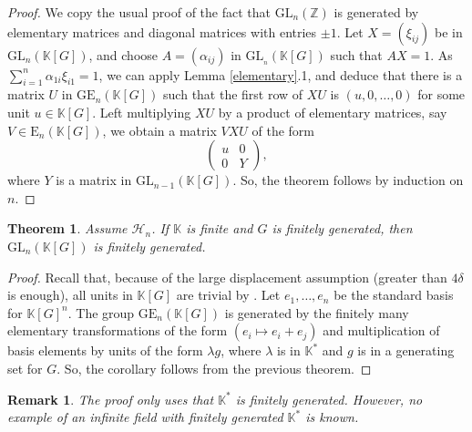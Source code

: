 \documentclass[11pt,letterpaper]{amsart}
\newtheorem{theorem}{Theorem}
\newtheorem*{remark}{Remark}
\begin{document}
\begin{proof}
We copy the usual proof of the fact that $\text{GL}_n (\mathbb{Z})$ is generated by elementary matrices and diagonal matrices with entries $\pm 1$. Let $X = (\xi_{ij})$ be in $\text{GL}_n (\mathbb{K} [G])$, and choose $A=(\alpha_{ij})$ in $\text{GL}_{_n} (\mathbb{K} [G])$ such that $AX = 1$. As $\sum_{i = 1}^n \alpha_{1 i} \xi_{i 1} = 1$, we can apply Lemma \ref{elementary}.1, and deduce that there is a matrix $U$ in $\text{GE}_n (\mathbb{K} [G])$ such that the first row of $XU$ is $(u,0,\dots,0)$ for some unit $u\in\mathbb K[G]$. 
Left multiplying $XU$ by a product of elementary matrices, say $V \in \text{E}_n (\mathbb{K} [G])$, we obtain a matrix $VXU$ of the form 
$$
\left(\begin{array}{cc}
    u & 0\\
    0 & Y
\end{array}\right),
$$ 
where $Y$ is a matrix in $\text{GL}_{n - 1} (\mathbb{K}[G])$. So, the theorem follows by induction on $n$.
\end{proof}




{
\renewcommand{\thetheorem}{\ref{fg}}

\begin{theorem}
Assume $\mathcal H_{n}$.  If $\mathbb K$ is finite and $G$ is finitely generated, then $\mathrm{GL}_n (\mathbb{K} [G])$ is finitely generated.
\end{theorem}
\addtocounter{theorem}{-1}
}




\begin{proof}
Recall that, because of the large displacement assumption (greater than $4\delta$ is enough), all units in $\mathbb K[G]$ are trivial by \cite{delzant}. Let $e_1,\dots,e_n$ be the standard basis for $\mathbb K[G]^n$. The group $\text{GE}_n(\mathbb K[G])$ is generated by the finitely many elementary transformations of the form $(e_i\mapsto e_i+e_j)$ and multiplication of basis elements by units of the form $\lambda g$, where $\lambda$ is in $\mathbb K^*$ and $g$ is in a generating set for $G$. So, the corollary follows from the previous theorem.  
\end{proof}
\begin{remark}
The proof only uses that $\mathbb K^*$ is finitely generated. However, no example of an infinite field with finitely generated $\mathbb K^*$ is known. 
\end{remark}
\end{document}
